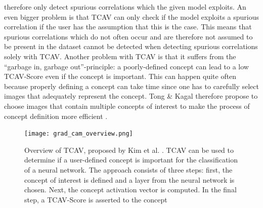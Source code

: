 \documentclass{article}
\begin{document}
therefore only detect spurious correlations which the given model exploits. An even bigger problem is that TCAV can only
check if the model exploits a spurious correlation if the user has the assumption that this is the case.
This means that spurious correlations which do not often occur and are therefore not assumed to be present
in the dataset cannot be detected when detecting spurious correlations solely with TCAV. Another problem with TCAV
is that it suffers from the \enquote{garbage in, garbage out}-principle: a poorly-defined concept can lead to a low
TCAV-Score even if the concept is important. This can happen quite often because properly defining a concept can take time
since one has to carefully select images that adequately represent the concept. Tong \& Kagal therefore propose to choose
images that contain multiple concepts of interest to make the process of concept definition
more efficient \cite{tong2020investigating}.

\begin{figure}
    \centering
    \texttt{[image: grad\_cam\_overview.png]}
    \caption{Overview of TCAV, proposed by Kim et al. \cite{pmlr-v80-kim18d}. TCAV can be used to determine if a user-defined
    concept is important for the classification of a neural network. The approach consists of three steps: first,
    the concept of interest is defined and a layer from the neural network is chosen. Next, the concept activation
    vector is computed. In the final step, a TCAV-Score is asserted to the concept}
    \label{fig:tcav}
\end{figure}
\end{document}
